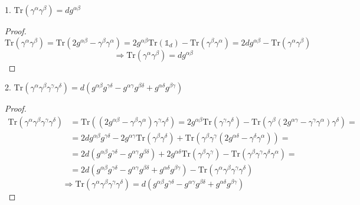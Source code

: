 1. $\mathrm{Tr} \left( \gamma^{\alpha} \gamma^{\beta} \right) = dg^{\alpha\beta}$
\begin{proof}
\begin{equation*}
\mathrm{Tr} \left( \gamma^{\alpha} \gamma^{\beta} \right) = \mathrm{Tr} \left( 2 g^{\alpha\beta} - \gamma^{\beta}\gamma^{\alpha} \right) = 2g^{\alpha\beta} \mathrm{Tr} \left( \mathds{1}_d \right) - \mathrm{Tr} \left( \gamma^{\beta} \gamma^{\alpha} \right) = 2dg^{\alpha\beta} - \mathrm{Tr} \left( \gamma^{\alpha} \gamma^{\beta} \right)
\end{equation*}
\begin{equation*}
\Rightarrow \mathrm{Tr} \left( \gamma^{\alpha} \gamma^{\beta} \right) = dg^{\alpha\beta}
\end{equation*}
\end{proof}

2. $\mathrm{Tr} \left( \gamma^{\alpha}\gamma^{\beta}\gamma^{\gamma}\gamma^{\delta} \right) = d \left( g^{\alpha\beta}g^{\gamma\delta} - g^{\alpha\gamma}g^{\beta\delta} + g^{\alpha\delta}g^{\beta\gamma} \right)$
\begin{proof}
\begin{align*}
\mathrm{Tr} \left( \gamma^{\alpha}\gamma^{\beta}\gamma^{\gamma}\gamma^{\delta} \right) & = \mathrm{Tr} \left( \left( 2g^{\alpha\beta} - \gamma^{\beta}\gamma^{\alpha} \right) \gamma^{\gamma} \gamma^{\delta} \right) = 2g^{\alpha\beta} \mathrm{Tr} \left( \gamma^{\gamma}\gamma^{\delta}\right) - \mathrm{Tr} \left( \gamma^{\beta} \left( 2g^{\alpha\gamma} - \gamma^{\gamma} \gamma^{\alpha} \right) \gamma^{\delta} \right) = & \\
& = 2d g^{\alpha\beta} g^{\gamma\delta} - 2g^{\alpha\gamma} \mathrm{Tr} \left( \gamma^{\beta}\gamma^{\delta} \right) + \mathrm{Tr} \left( \gamma^{\beta} \gamma^{\gamma} \left( 2g^{\alpha\delta} - \gamma^{\delta}\gamma^{\alpha} \right) \right) = & \\
& = 2d \left( g^{\alpha\beta} g^{\gamma\delta} - g^{\alpha\gamma} g^{\beta\delta} \right) + 2g^{\alpha\delta} \mathrm{Tr} \left( \gamma^{\beta}\gamma^{\gamma} \right) - \mathrm{Tr} \left( \gamma^{\beta}\gamma^{\gamma}\gamma^{\delta}\gamma^{\alpha} \right) = & \\
& = 2d \left( g^{\alpha\beta} g^{\gamma\delta} - g^{\alpha\gamma}g^{\beta\delta} + g^{\alpha\delta} g^{\beta\gamma} \right) - \mathrm{Tr} \left( \gamma^{\alpha}\gamma^{\beta}\gamma^{\gamma}\gamma^{\delta} \right) & 
\end{align*}
\begin{equation*}
\Rightarrow \mathrm{Tr} \left( \gamma^{\alpha}\gamma^{\beta}\gamma^{\gamma}\gamma^{\delta} \right) = d \left( g^{\alpha\beta}g^{\gamma\delta} - g^{\alpha\gamma}g^{\beta\delta} + g^{\alpha\delta}g^{\beta\gamma} \right)
\end{equation*}
\end{proof}



